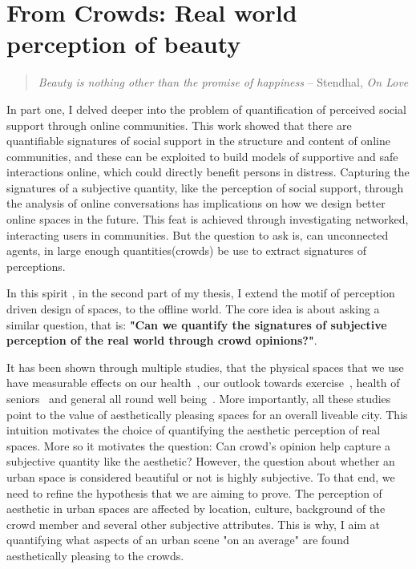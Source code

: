 \chapter{From Crowds: Real world perception of beauty}
\label{chap:quant_perception}


\graphicspath{{Chapter4/plots/} {Chapter4/plots/examples/} {Chapter4/plots/GAN_examples/}}
\begin{quote}
    \textsl{Beauty is nothing other than the promise of happiness}
    -- Stendhal, \textsl{On Love}
\end{quote}

In part one, I delved deeper into the problem of quantification of perceived social support through online communities. This work showed that there are quantifiable signatures of social support in the structure and content of online communities, and these can be exploited to build models of supportive and safe interactions online, which could directly benefit persons in distress. Capturing the signatures of a subjective quantity, like the perception of social support, through the analysis of online conversations has implications on how we design better online spaces in the future. This feat is achieved through investigating networked, interacting users in communities. But the question to ask is, can unconnected agents, in large enough quantities(crowds) be use to extract signatures of perceptions. 
 
In this spirit , in the second part of my thesis, I extend the motif of perception driven design of spaces, to the offline world. The core idea is about asking a similar question, that is: \textbf{"Can we quantify the signatures of subjective perception of the real world through crowd opinions?"}. 

It has been shown through multiple studies, that the physical spaces that we use have measurable effects on our health~\cite{maas2006green,lee2011health}, our outlook towards exercise~\cite{tamosiunas2014accessibility}, health of seniors~\cite{takano2002urban} and general all round well being~\cite{gascon2015mental,nutsford2013ecological}. More importantly, all these studies point to the value of aesthetically pleasing spaces for an overall liveable city. This intuition motivates the choice of quantifying the aesthetic perception of real spaces. More so it motivates the question: Can crowd's opinion help capture a subjective quantity like the aesthetic? 
However, the question about whether an urban space is considered beautiful or not is highly subjective. To that end, we need to refine the hypothesis that we are aiming to prove. The perception of aesthetic in urban spaces are affected by location, culture, background of the crowd member and several other subjective attributes. This is why, I aim at quantifying what aspects of an urban scene "on an average" are found aesthetically pleasing to the crowds.

